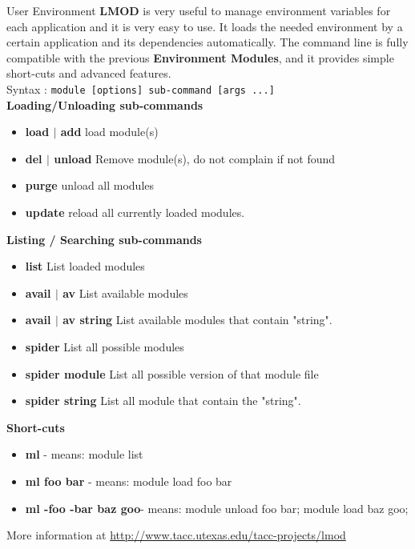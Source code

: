 \documentclass[final,t]{beamer}
\begin{document}
\begin{frame}[fragile]{}
\begin{columns}[t]
\begin{column}{.35\linewidth}
      \begin{block}{User Environment}
      \textbf{LMOD} is very useful to manage environment variables for each application and it is very easy to use. It loads the needed environment by a certain application and its dependencies automatically. The command line is fully compatible with the previous \textbf{Environment Modules}, and it provides simple short-cuts and advanced features.\\
      Syntax : \verb|module [options] sub-command [args ...]|\\
      \textbf{Loading/Unloading sub-commands}
        \begin{itemize}
        \item  \textbf{load $|$ add} load module(s)
        \item  \textbf{del $|$ unload} Remove module(s), do not complain if not found
        \item  \textbf{purge} unload all modules
        \item  \textbf{update} reload all currently loaded modules.
        \end{itemize}
       \textbf{Listing / Searching sub-commands}
        \begin{itemize}
        \item  \textbf{list} List loaded modules
        \item  \textbf{avail $|$ av} List available modules
        \item  \textbf{avail $|$ av string} List available modules that contain "string".
        \item  \textbf{spider} List all possible modules
        \item  \textbf{spider module} List all possible version of that module file
        \item  \textbf{spider string} List all module that contain the "string".
        \end{itemize}
       \textbf{Short-cuts}
       \begin{itemize}
        \item \textbf{ml} - means: module list
        \item \textbf{ml foo bar} - means: module load foo bar
        \item \textbf{ml -foo -bar baz goo}- means: module unload foo bar; module load baz goo;
        \end{itemize}
        More information at \url{http://www.tacc.utexas.edu/tacc-projects/lmod}
      \end{block}
      
    \end{column}
  \end{columns}
\end{frame}
\end{document}
